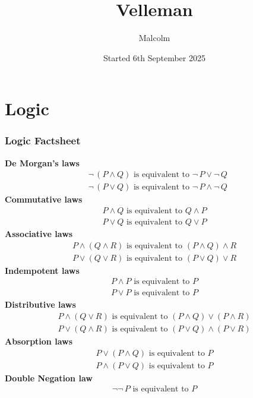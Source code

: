 \documentclass{report}
\title{Velleman}
\date{Started 6th September 2025}
\author{Malcolm}
\theoremstyle{definition}
\begin{document}
\maketitle

\tableofcontents

\newpage
\chapter{Logic}
\subsection{Logic Factsheet}
\textbf{De Morgan's laws}
\begin{align*}
&\neg\,(P\land Q)\text{ is equivalent to }\neg\,P\lor\neg\,Q\\
&\neg\,(P\lor Q)\text{ is equivalent to }\neg\,P\land\neg\,Q
\end{align*}
\textbf{Commutative laws}
\begin{align*}
P\land Q\text{ is equivalent to }Q\land P\\
P\lor Q\text{ is equivalent to }Q\lor P
\end{align*}
\textbf{Associative laws}
\begin{align*}
P\land(Q\land R)\text{ is equivalent to }(P\land Q)\land R\\
P\lor(Q\lor R)\text{ is equivalent to }(P\lor Q)\lor R
\end{align*}
\textbf{Indempotent laws}
\begin{align*}
P\land P\text{ is equivalent to }P\\
P\lor P\text{ is equivalent to }P
\end{align*}
\textbf{Distributive laws}
\begin{align*}
P\land(Q\lor R)\text{ is equivalent to }(P\land Q)\lor(P\land R)\\
P\lor(Q\land R)\text{ is equivalent to }(P\lor Q)\land(P\lor R)
\end{align*}
\textbf{Absorption laws}
\begin{align*}
P\lor(P\land Q)\text{ is equivalent to }P\\
P\land(P\lor Q)\text{ is equivalent to }P
\end{align*}
\textbf{Double Negation law}
\begin{align*}
\neg\neg\,P\text{ is equivalent to }P
\end{align*}
\newpage
\end{document}
